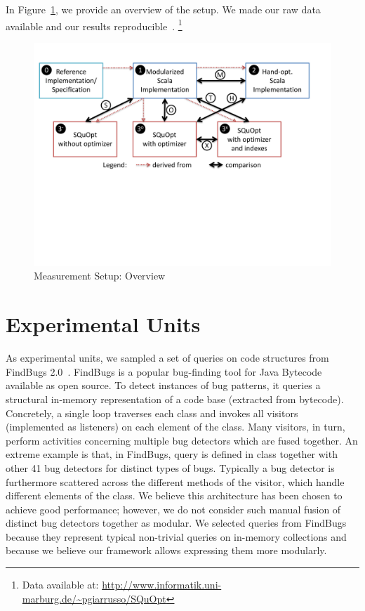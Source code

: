 In Figure~\ref{fig:measurements-overview}, we provide an overview of the setup.
	We made our raw data available and our results reproducible~\citep{Vitek11R3}.%
\footnote{Data available at: \url{http://www.informatik.uni-marburg.de/~pgiarrusso/SQuOpt}}

\begin{figure}
	\centering
		\includegraphics[width=\linewidth]{aosd13/graphs/measurements-overview}
	\caption{Measurement Setup: Overview}
	\label{fig:measurements-overview}
\end{figure}


\section{Experimental Units}




As experimental units, we sampled a set of queries on code structures from FindBugs 2.0~\citep{DBLP:journals/sigplan/HovemeyerP04}. FindBugs is a popular bug-finding tool for Java Bytecode available as open source. To detect instances of bug patterns, it queries a structural in-memory representation of a code base (extracted from bytecode).
Concretely, a single loop traverses each class and invokes all visitors (implemented as listeners) on each element of the class. Many visitors, in turn, perform activities concerning multiple bug detectors which are fused together. An extreme example is that, in FindBugs, query \queryRUNFINALIZERSONEXIT{} is defined in class  together with other 41 bug detectors for distinct types of bugs.
Typically a bug detector is furthermore scattered across the different methods of the visitor, which handle different elements of the class.
We believe this architecture has been chosen to achieve good performance; however, we do not consider such manual fusion of distinct bug detectors together as modular. We selected queries from FindBugs because they represent typical non-trivial queries on in-memory collections and because we believe our framework allows expressing them more modularly.

